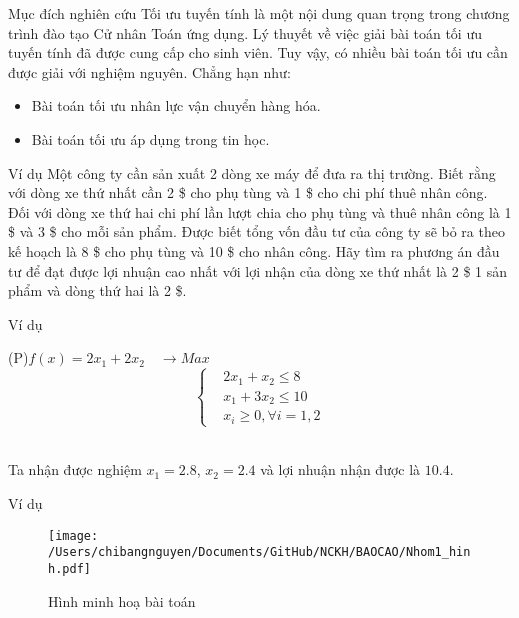 \documentclass{beamer}
\begin{document}
\begin{frame}{Mục đích nghiên cứu}
    Tối ưu tuyến tính là một nội dung quan trọng trong chương trình đào tạo Cử nhân Toán ứng dụng. Lý thuyết về việc giải bài toán tối ưu tuyến tính đã được cung cấp cho sinh viên. Tuy vậy, có nhiều bài toán tối ưu cần được giải với nghiệm nguyên. Chẳng hạn như:
    \begin{itemize}
    \item Bài toán tối ưu nhân lực vận chuyển hàng hóa.
    \item Bài toán tối ưu áp dụng trong tin học.
    \end{itemize}
\end{frame}
\begin{frame}{Ví dụ}
    Một công ty cần sản xuất 2 dòng xe máy để đưa ra thị trường. Biết rằng với dòng xe thứ nhất cần 2 \$ cho phụ tùng và 1 \$ cho chi phí thuê nhân công. Đối với dòng xe thứ hai chi phí lần lượt chia cho phụ tùng và thuê nhân công là 1 \$ và 3 \$ cho mỗi sản phẩm. Được biết tổng vốn đầu tư của công ty sẽ bỏ ra theo kế hoạch là 8 \$ cho phụ tùng và 10 \$ cho nhân công. Hãy tìm ra phương án đầu tư để đạt được lợi nhuận cao nhất với lợi nhận của dòng xe thứ nhất là 2 \$ 1 sản phẩm và dòng thứ hai là 2 \$.
\end{frame}
\begin{frame}{Ví dụ}
    \begin{center}                    
        \big(P\big)\quad $f(x)=2x_1+2x_2\quad \longrightarrow Max$\\
        \[\left\{\begin{aligned}
            &2x_1+x_2 \leq  8 \\
            &x_1+3x_2 \leq 10 \\
            &x_i\geq 0,\forall i=1,2
        \end{aligned}\right.\]\\
        \end{center}  
        Ta nhận được nghiệm $x_1=2.8$, $x_2=2.4$ và lợi nhuận nhận được là $10.4$.    
  
\end{frame}

\begin{frame}{Ví dụ}
    \begin{center}
        \begin{figure}[ht]
            \begin{center}

            \texttt{[image: /Users/chibangnguyen/Documents/GitHub/NCKH/BAOCAO/Nhom1\_hinh.pdf]}
            
            Hình minh hoạ bài toán
            \end{center}
      \end{figure}
      \end{center}
\end{frame}
\end{document}
